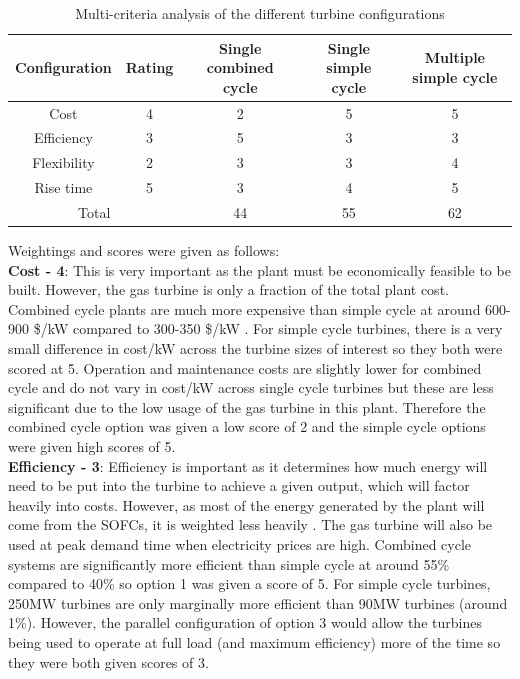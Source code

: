 \begin {table} [h]
\begin{center}
\caption{Multi-criteria analysis of the different turbine configurations} \label{tab:MCA} 
\begin{tabular}{ |c|c|c|c|c| }
 \hline
  Configuration & Rating & Single combined cycle & Single simple cycle & Multiple simple cycle\\ 
 \hline
  Cost & 4 & 2 & 5 & 5 \\ 
 \hline
  Efficiency & 3 & 5 & 3 & 3\\ 
 \hline
  Flexibility & 2 & 3 & 3 & 4\\
 \hline
  Rise time & 5 & 3 & 4 & 5\\
   \hline
   \multicolumn{2}{|c|}{Total}  & 44 & 55 & 62 \\
 \hline
\end{tabular}
\end{center}  
\end {table}
Weightings and scores were given as follows: 
\\\textbf{Cost - 4}: This is very important as the plant must be economically feasible to be built. However, the gas turbine is only a fraction of the total plant cost. Combined cycle plants are much more expensive than simple cycle at around 600-900 \$/kW compared to 300-350 \$/kW \cite{turbinecost}. For simple cycle turbines, there is a very small difference in cost/kW across the turbine sizes of interest so they both were scored at 5. Operation and maintenance costs are slightly lower for combined cycle and do not vary in cost/kW across single cycle turbines but these are less significant due to the low usage of the gas turbine in this plant. \cite{boyce} Therefore the combined cycle option was given a low score of 2 and the simple cycle options were given high scores of 5.
\\\textbf{Efficiency - 3}: Efficiency is important as it determines how much energy will need to be put into the turbine to achieve a given output, which will factor heavily into costs. However, as most of the energy generated by the plant will come from the SOFCs, it is weighted less heavily . The gas turbine will also be used at peak demand time when electricity prices are high. Combined cycle systems are significantly more efficient than simple cycle at around 55\% compared to 40\% so option 1 was given a score of 5. For simple cycle turbines, 250MW turbines are only marginally more efficient than 90MW turbines (around 1\%). However, the parallel configuration of option 3 would allow the turbines being used to operate at full load (and maximum efficiency) more of the time so they were both given scores of 3.
